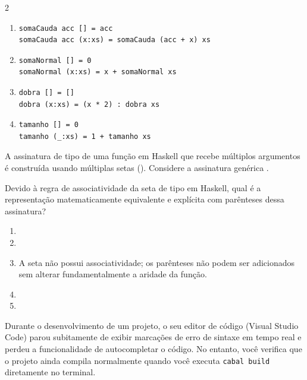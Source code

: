 \documentclass[a4paper,10pt,brazil]{article}
\begin{document}
\begin{multicols}{2}
\begin{enumerate}
  \item \begin{verbatim}
somaCauda acc [] = acc
somaCauda acc (x:xs) = somaCauda (acc + x) xs
\end{verbatim}

  \item \begin{verbatim}
somaNormal [] = 0
somaNormal (x:xs) = x + somaNormal xs
\end{verbatim}

  \item \begin{verbatim}
dobra [] = []
dobra (x:xs) = (x * 2) : dobra xs
\end{verbatim}

  \item \begin{verbatim}
tamanho [] = 0
tamanho (_:xs) = 1 + tamanho xs
\end{verbatim}


\end{enumerate}

A assinatura de tipo de uma função em Haskell que recebe múltiplos argumentos é construída usando múltiplas setas (\haskellinline{->}). Considere a assinatura genérica . 

Devido à regra de associatividade da seta de tipo em Haskell, qual é a representação matematicamente equivalente e explícita com parênteses dessa assinatura?

\begin{enumerate}
  \item {}

  \item {}

  \item A seta não possui associatividade; os parênteses não podem ser adicionados sem alterar fundamentalmente a aridade da função.

  \item {}

  \item {}


\end{enumerate}

Durante o desenvolvimento de um projeto, o seu editor de código (Visual Studio Code) parou subitamente de exibir marcações de erro de sintaxe em tempo real e perdeu a funcionalidade de autocompletar o código. No entanto, você verifica que o projeto ainda compila normalmente quando você executa \texttt{cabal build} diretamente no terminal. 


\end{multicols}
\end{document}
